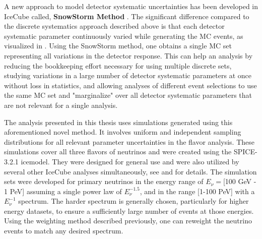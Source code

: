 A new approach to model detector systematic uncertainties has been developed in IceCube called, \textbf{SnowStorm Method} . The significant difference compared to the discrete systematics approach described above is that each detector systematic parameter continuously varied while generating the MC events, as visualized in . Using the SnowStorm method, one obtains a single MC set representing all variations in the detector response. This can help an analysis by reducing the bookkeeping effort necessary for using multiple discrete sets, studying variations in a large number of detector systematic parameters at once without loss in statistics, and allowing analyses of different event selections to use the same MC set and "marginalize" over all detector systematic parameters that are not relevant for a single analysis.

The analysis presented in this thesis uses simulations generated using this aforementioned novel method. It involves uniform and independent sampling distributions for all relevant parameter uncertainties in the flavor analysis. These simulations cover all three flavors of neutrinos and were created using the SPICE-3.2.1 icemodel. They were designed for general use and were also utilized by several other IceCube analyses simultaneously, see  and  for details. The simulation sets were developed for primary neutrinos in the energy range of $E_{\nu} = $[100 GeV - 1 PeV] assuming a single power law of $E_{\nu}^{-1.5}$, and in the range [1-100 PeV] with a $E_{\nu}^{-1}$ spectrum. The harder spectrum is generally chosen, particularly for higher energy datasets, to ensure a sufficiently large number of events at those energies. Using the weighting method described previously, one can reweight the neutrino events to match any desired spectrum.

